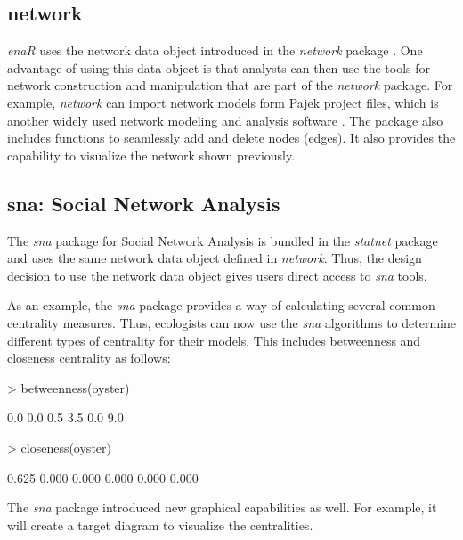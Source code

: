 \documentclass[article]{jss}
\begin{document}
\subsection{network}
\textit{enaR} uses the network data object introduced in the
\textit{network} package \citep{butts08_network}.  One advantage of
using this data object is that analysts can then use the tools for
network construction and manipulation that are part of the
\textit{network} package.  For example, \textit{network} can import
network models form Pajek project files, which is another widely used
network modeling and analysis software \cite{batajel07}.  The package
also includes functions to seamlessly add and delete nodes (edges).
It also provides the capability to visualize the network shown previously.

\subsection{sna: Social Network Analysis}
The \textit{sna} package for Social Network Analysis is bundled in the
\textit{statnet} package and uses the same network data object defined
in \textit{network}.  Thus, the design decision to use the network
data object gives users direct access to \textit{sna} tools.

As an example, the \textit{sna} package provides a way of calculating
several common centrality measures.  Thus, ecologists can now use the
\textit{sna} algorithms to determine different types of centrality for their
models.  This includes betweenness and closeness centrality as follows:

\begin{Schunk}
\begin{Sinput}
> betweenness(oyster)
\end{Sinput}
\begin{Soutput}
[1] 0.0 0.0 0.5 3.5 0.0 9.0
\end{Soutput}
\begin{Sinput}
> closeness(oyster)
\end{Sinput}
\begin{Soutput}
[1] 0.625 0.000 0.000 0.000 0.000 0.000
\end{Soutput}
\end{Schunk}

The \textit{sna} package introduced new graphical capabilities as
well. For example, it will create a target diagram to visualize the centralities.

\end{document}
